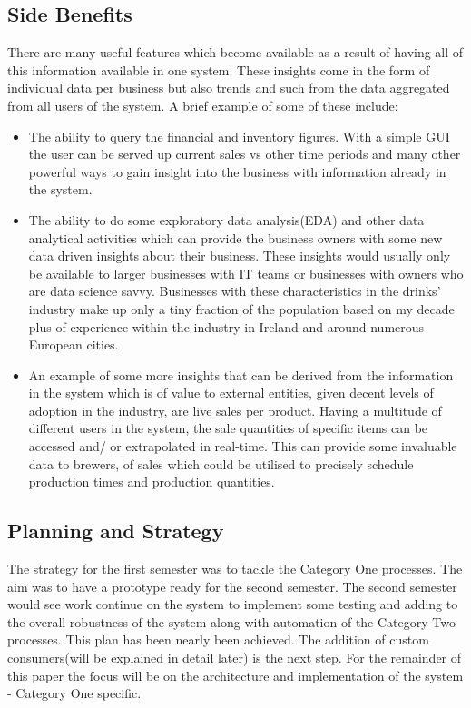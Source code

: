 \begin{flushleft}
	\subsection{Side Benefits}
	There are many useful features which become available as a result of having all of this information available in one system. These insights come in the form of individual data per
	business but also trends and such from the data aggregated from all users of the system. A brief example of some of these include:
	\begin{itemize}
		\item The ability to query the financial and inventory figures. With a simple GUI the user can be served up current sales vs other time periods and many other powerful ways to gain insight into
		      the business with information already in the system.
		\item The ability to do some exploratory data analysis(EDA) and other data analytical activities which can provide the business owners with some new data driven insights about their business.
		      These insights would usually only be available to larger businesses with IT teams or businesses with owners who are data science savvy. Businesses with these characteristics in the
		      drinks' industry make up only a tiny fraction of the population based on my decade plus of experience within the industry in Ireland and around numerous European cities.
		\item An example of some more insights that can be derived from the information in the system which is of value to external entities, given decent levels of adoption in the industry,
		      are live sales per product.
		      Having a multitude of different users in the system, the sale quantities of specific items can be accessed and/ or extrapolated in real-time. This can provide some invaluable
		      data to brewers, of sales which could be utilised to precisely schedule production times and production quantities.
	\end{itemize}

	\subsection{Planning and Strategy}
	The strategy for the first semester was to tackle the Category One processes. The aim was to have a prototype ready for the second semester. The second semester would see work continue
	on the system to implement some testing and adding to the overall robustness of the system along with automation of the Category Two processes.
	This plan has been nearly been achieved. The addition of custom consumers(will be explained in detail later) is the next step. For the remainder of this paper the focus will be on the
	architecture and implementation of the system - Category One specific.
	\pagebreak

\end{flushleft}
